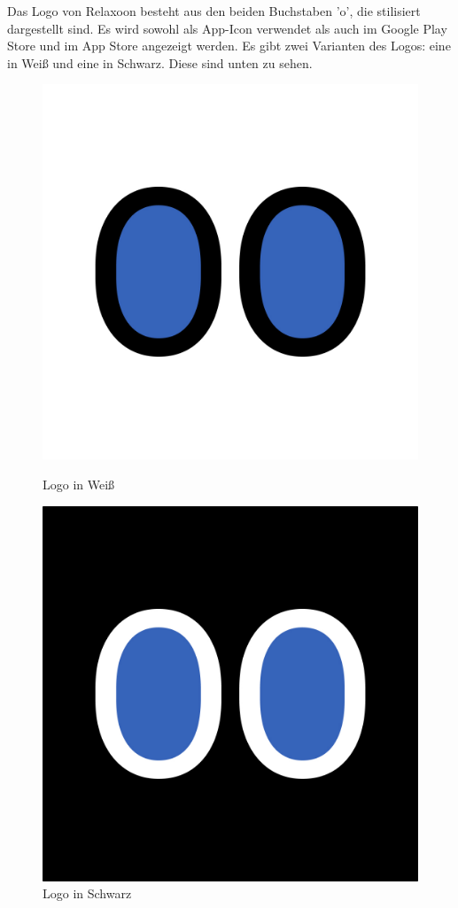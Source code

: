 Das Logo von Relaxoon besteht aus den beiden Buchstaben 'o', die stilisiert dargestellt sind. 
Es wird sowohl als App-Icon verwendet als auch im Google Play Store und im App Store angezeigt werden. Es gibt zwei 
Varianten des Logos: eine in Weiß und eine in Schwarz. Diese sind unten zu sehen.

\begin{figure}[H]
    \begin{minipage}{0.5\textwidth}
        \centering
        \includegraphics[height=0.8\textwidth]{./pics/Relaxoon Logo White.jpg}
        \caption{Logo in Weiß}
    \end{minipage}
    \begin{minipage}{0.5\textwidth}
        \centering
        \includegraphics[height=0.8\textwidth]{./pics/Relaxoon Logo Black.jpg}
        \caption{Logo in Schwarz}
    \end{minipage}
\end{figure}